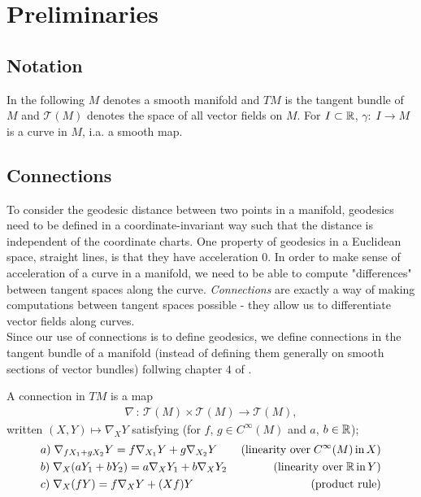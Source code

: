 \chapter{Preliminaries}

\section{Notation}

In the following $M$ denotes a smooth manifold and $TM$ is the tangent bundle of $M$ and $\mathcal{T}(M)$ denotes the space of all vector fields on $M$. For $I \subset \mathbb{R}$, $\gamma: \; I \rightarrow M$ is a curve in $M$, i.a. a smooth map.  

\section{Connections}

To consider the geodesic distance between two points in a manifold, geodesics need to be defined in a coordinate-invariant way such that the distance is independent of the coordinate charts. One property of geodesics in a Euclidean space, straight lines, is that they have acceleration $0$. In order to make sense of acceleration of a curve in a manifold, we need to be able to compute "differences" between tangent spaces along the curve. \textit{Connections} are exactly a way of making computations between tangent spaces possible - they allow us to differentiate vector fields along curves.\\[0.2 cm]
Since our use of connections is to define geodesics, we define connections in the tangent bundle of a manifold (instead of defining them generally on smooth sections of vector bundles) follwing chapter $4$ of \citet{RiemannLee}. 

\begin{definition}
A connection in $TM$ is a map
\begin{align*}
\nabla \, : \, \mathcal{T}(M) \times \mathcal{T}(M) \rightarrow \mathcal{T}(M),
\end{align*}
written $(X, Y) \mapsto \nabla_X Y$ satisfying (for $f$, $g \in C^\infty(M)$ and $a$, $b \in \mathbb{R}$);
\begin{align*}
& a) \; \nabla_{fX_1 + gX_2} Y = f\nabla_{X_1} Y + g\nabla_{X_2} Y \; \; \; \; & \text{(linearity over} \; C^\infty(M) \, \text{in} \, X) \\
& b) \; \nabla_X (aY_1 + bY_2) = a\nabla_X Y_1 + b\nabla_X Y_2 & \text{(linearity over} \; \mathbb{R} \, \text{in} \, Y) \\
& c) \; \nabla_X (fY) = f\nabla_X Y + (Xf)Y & \text{(product rule)}
\end{align*}
\end{definition}

